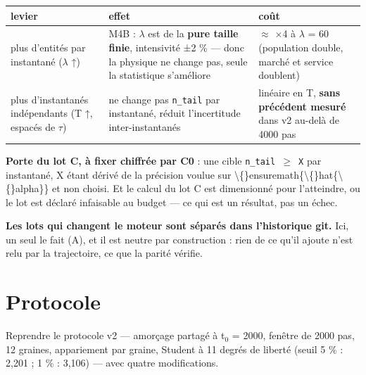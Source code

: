 \documentclass[11pt,a4paper]{article}
\newcommand{\code}[1]{\texttt{#1}}
\begin{document}
\begin{center}
\begin{tabularx}{\linewidth}{@{}XXX@{}}
\toprule
\textbf{levier} & \textbf{effet} & \textbf{coût} \\
\midrule
plus d'entités par instantané (\ensuremath{\lambda} ↑) & M4B : \ensuremath{\lambda} est de la \textbf{pure taille finie}, intensivité ±2 \% --- donc la physique ne change pas, seule la statistique s'améliore & \ensuremath{\approx} \ensuremath{\times}4 à \ensuremath{\lambda} = 60 (population double, marché et service doublent) \\
plus d'instantanés indépendants (T ↑, espacés de \ensuremath{\tau}) & ne change pas \code{n\_tail} par instantané, réduit l'incertitude inter-instantanés & linéaire en T, \textbf{sans précédent mesuré} dans v2 au-delà de 4000 pas \\
\bottomrule
\end{tabularx}
\end{center}

\textbf{Porte du lot C, à fixer chiffrée par C0} : une cible \code{n\_tail \ensuremath{\geq} X} par instantané, X étant dérivé de la précision voulue sur \textbackslash\{\}ensuremath\{\textbackslash\{\}hat\{\textbackslash\{\}alpha\}\} et non choisi. Et le calcul du lot C est dimensionné pour l'atteindre, ou le lot est déclaré infaisable au budget --- ce qui est un résultat, pas un échec.

\textbf{Les lots qui changent le moteur sont séparés dans l'historique git.} Ici, un seul le fait (A), et il est neutre par construction : rien de ce qu'il ajoute n'est relu par la trajectoire, ce que la parité vérifie.

\bigskip

\setcounter{section}{5}
\section{Protocole}

Reprendre le protocole v2 --- amorçage partagé à t\ensuremath{_0} = 2000, fenêtre de 2000 pas, 12 graines, appariement par graine, Student à 11 degrés de liberté (seuil 5 \% : 2,201 ; 1 \% : 3,106) --- avec quatre modifications.
\end{document}
